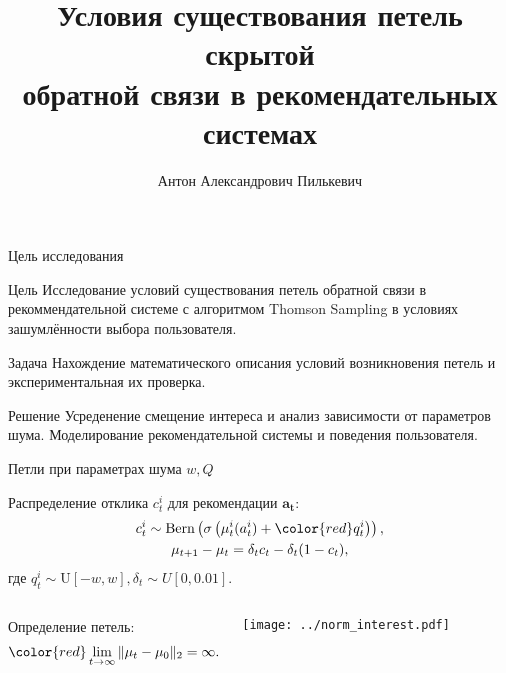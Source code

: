 \documentclass{beamer}
\title[\hbox to 56mm{Петли скрытой обратной связи}]{ Условия существования петель скрытой \\ обратной связи в рекомендательных системах }
\author[А.\,А. Пилькевич]{Антон Александрович Пилькевич}
\institute{Московский физико-технический институт}
\date{\footnotesize
\par\smallskip\emph{Курс:} Автоматизация научных исследований\par (практика, В.\,В.~Стрижов)/Группа 813
\par\smallskip\emph{Эксперт:} А.\,С.~Хританков
\par\smallskip\emph{Консультант:} А.\,С.~Хританков
\par\bigskip\small 2021}
\begin{document}
\begin{frame}
\thispagestyle{empty}
\maketitle
\end{frame}
\begin{frame}{Цель исследования}
\begin{block}{Цель}
  Исследование условий существования петель обратной
связи в рекоммендательной системе с алгоритмом Thomson Sampling в условиях зашумлённости выбора пользователя.
\end{block}
\begin{block}{Задача}
  Нахождение математического описания условий возникновения петель и экспериментальная их проверка. 
\end{block}
\begin{block}{Решение}
  Усреденение смещение интереса и анализ зависимости от параметров шума. 
  Моделирование рекомендательной системы и поведения пользователя.
\end{block}
\end{frame}
\begin{frame}{Петли при параметрах шума $w, Q$}

Распределение отклика $c_t^i$ для рекомендации $\mathbf{a_t}$:
\begin{gather*}
    c_t^i \sim \text{Bern} \left(\sigma\left(\mu_t^i (a_t^i) + \mathbin{\color{red} q_t^i } \right) \right), \\ 
    \mu_{t+1} - \mu_{t} = \delta_t c_t - \delta_t (1 - c_t), 
\end{gather*}
где $q_t^i \sim \text{U}[-w, w], \delta_t \sim U[0, 0.01].$

\begin{columns}[c]
Определение петель: 
\begin{gather*}
  \color{red} \lim_{t \to \infty} \|\mu_t - \mu_0 \|_2 = \infty.
\end{gather*}
\begin{center}
  \texttt{[image: ../norm\_interest.pdf]}
\end{center}
\end{columns}
\end{frame}
\end{document}
